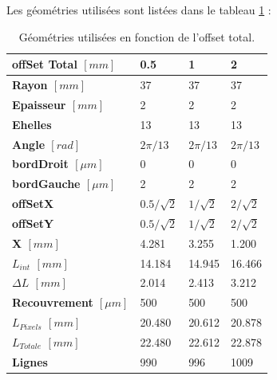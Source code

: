    \medskip
   
   Les g\'eom\'etries utilis\'ees sont list\'ees dans le tableau \ref{tab:geom_offset} :
   
   \begin{table}[h]
   \centering
   \begin{tabular}{|l|l|l|l|}
   \hline
   \textbf{offSet Total $[mm]$}    & \textbf{0.5} & \textbf{1} & \textbf{2} \\ \hline
   \textbf{Rayon $[mm]$}           & 37           & 37         & 37         \\ \hline
   \textbf{Epaisseur $[mm]$}       & 2            & 2          & 2          \\ \hline
   \textbf{Ehelles}              & 13           & 13         & 13         \\ \hline
   \textbf{Angle $[rad]$}          & $2 \pi /13$    & $2 \pi /13$  & $2 \pi /13$  \\ \hline
   \textbf{bordDroit $[\mu m]$}    & 0            & 0          & 0          \\ \hline
   \textbf{bordGauche $[\mu m]$}   & 2            & 2          & 2          \\ \hline
   \textbf{offSetX}              & $0.5/\sqrt{2}$  & $1/\sqrt{2}$  & $2/\sqrt{2}$  \\ \hline
   \textbf{offSetY}              & $0.5/\sqrt{2}$  & $1/\sqrt{2}$  & $2/\sqrt{2}$  \\ \hline
   \textbf{X $[mm]$}               & 4.281        & 3.255      & 1.200      \\ \hline
   \textbf{$L_{int}$ $[mm]$}            & 14.184       & 14.945     & 16.466     \\ \hline
   \textbf{$\Delta L$ $[mm]$}          & 2.014        & 2.413      & 3.212      \\ \hline
   \textbf{Recouvrement $[\mu m]$} & 500          & 500        & 500        \\ \hline
   \textbf{$L_{Pixels}$ $[mm]$}         & 20.480       & 20.612     & 20.878     \\ \hline
   \textbf{$L_{Totale}$ $[mm]$}        & 22.480       & 22.612     & 22.878     \\ \hline
   \textbf{Lignes}               & 990          & 996        & 1009       \\ \hline
   \end{tabular}
   \caption{G\'eom\'etries utilis\'ees en fonction de l'offset total.}
   \label{tab:geom_offset}
   \end{table}
   
